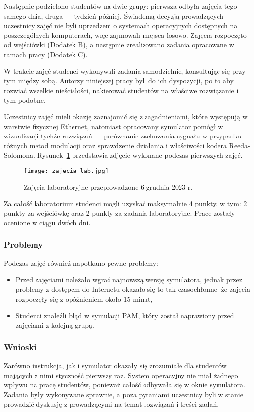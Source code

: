 Następnie podzielono studentów na dwie grupy: pierwsza odbyła zajęcia tego samego dnia, druga --- tydzień później. Świadomą decyzją prowadzących uczestnicy zajęć nie byli uprzedzeni o systemach operacyjnych dostępnych na poszczególnych komputerach, więc zajmowali miejsca losowo. Zajęcia rozpoczęto od wejściówki (Dodatek B), a następnie zrealizowano zadania opracowane w ramach pracy (Dodatek C).

W trakcie zajęć studenci wykonywali zadania samodzielnie, konsultując się przy tym między sobą. Autorzy niniejszej pracy
byli do ich dyspozycji, po to aby rozwiać wszelkie nieścisłości, nakierować studentów na właściwe rozwiązanie i tym podobne.

Uczestnicy zajęć mieli okazję zaznajomić się z zagadnieniami, które występują w warstwie fizycznej Ethernet, natomiast
opracowany symulator pomógł w wizualizacji tychże rozwiązań --- porównanie zachowania sygnału w przypadku różnych metod modulacji oraz
sprawdzenie działania i właściwości kodera Reeda-Solomona. Rysunek~\ref{fig:zajecia_lab_zdjecie} przedstawia zdjęcie wykonane podczas pierwszych zajęć.

\begin{figure}[H]
    \centering
    \texttt{[image: zajecia\_lab.jpg]}
    \caption{Zajęcia laboratoryjne przeprowadzone 6 grudnia 2023 r.}
    \label{fig:zajecia_lab_zdjecie}
\end{figure}

Za całość laboratorium studenci mogli uzyskać maksymalnie 4 punkty, w tym: 2 punkty za wejściówkę oraz 2 punkty za zadania laboratoryjne. Prace zostały ocenione w ciągu dwóch dni.

\subsubsection{Problemy}
Podczas zajęć również napotkano pewne problemy:
\begin{itemize}
    \item Przed zajęciami należało wgrać najnowszą wersję symulatora, jednak przez problemy z dostępem do Internetu okazało się to tak czasochłonne, że zajęcia rozpoczęły się z opóźnieniem około 15 minut,
    \item Studenci znaleźli błąd w symulacji PAM, który został naprawiony przed zajęciami z kolejną grupą.
\end{itemize}

\subsubsection{Wnioski}
Zarówno instrukcja, jak i symulator okazały się zrozumiałe dla studentów mających z nimi styczność pierwszy raz. System operacyjny nie miał żadnego wpływu na pracę studentów, ponieważ całość odbywała się w oknie symulatora. Zadania były wykonywane sprawnie, a poza pytaniami uczestnicy byli w stanie prowadzić dyskusję z prowadzącymi na temat rozwiązań i treści zadań.

